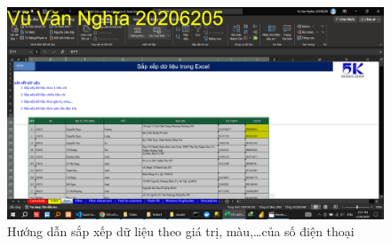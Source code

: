 \documentclass{article}
\begin{document}
\begin{figure}[h]
    \centering
    \includegraphics[scale = 0.15]{Video1/HuongDan/3.png}
    \caption{Hướng dẫn sắp xếp dữ liệu theo giá trị, màu,\dots của số điện thoại}
\end{figure}






























\end{document}
